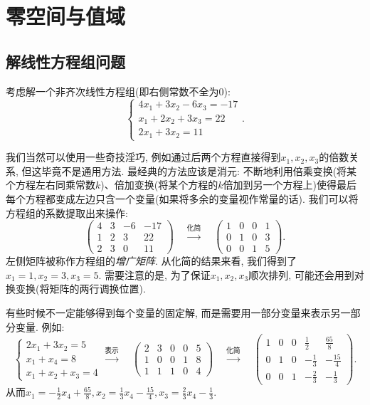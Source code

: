 \section{零空间与值域}

\subsection{解线性方程组问题}


考虑解一个非齐次线性方程组(即右侧常数不全为$0$): $$\begin{cases}
	4x_1+3x_2-6x_3=-17 \\ x_1+2x_2+3x_3=22 \\ 2x_1+3x_2 = 11
\end{cases}.$$

我们当然可以使用一些奇技淫巧, 例如通过后两个方程直接得到$x_1,x_2,x_3$的倍数关系, 但这毕竟不是通用方法. 最经典的方法应该是消元: 不断地利用倍乘变换(将某个方程左右同乘常数$k$)、倍加变换(将某个方程的$k$倍加到另一个方程上)使得最后每个方程都变成左边只含一个变量(如果将多余的变量视作常量的话). 我们可以将方程组的系数提取出来操作: $$\left(
\begin{array}{ccc|c}
  4 & 3 & -6 & -17 \\
  1 & 2 & 3 & 22 \\
  2 & 3 & 0 & 11
\end{array}
\right) \quad \stackrel{\textit{化简}}{\longrightarrow} \quad \left(
\begin{array}{ccc|c}
  1 & 0 & 0 & 1 \\
  0 & 1 & 0 & 3 \\
  0 & 0 & 1 & 5
\end{array}
\right).$$
左侧矩阵被称作方程组的\textit{增广矩阵}. 从化简的结果来看, 我们得到了$x_1=1,x_2=3,x_3=5$. 需要注意的是, 为了保证$x_1,x_2,x_3$顺次排列, 可能还会用到对换变换(将矩阵的两行调换位置). 

有些时候不一定能够得到每个变量的固定解, 而是需要用一部分变量来表示另一部分变量. 例如: $$\begin{cases}
	2x_1+3x_2=5 \\ x_1+x_4=8 \\ x_1+x_2+x_3=4
\end{cases}  \stackrel{\textit{表示}}{\longrightarrow} \quad \left(
\begin{array}{cccc|c}
  2 & 3 & 0 & 0 & 5 \\
  1 & 0 & 0 & 1 & 8 \\
  1 & 1 & 1 & 0 & 4
\end{array}
\right) \quad \stackrel{\textit{化简}}{\longrightarrow} \quad \left(
\begin{array}{cccc|c}
  1 & 0 & 0 & \frac{1}{2} & \frac{65}{8} \\
  0 & 1 & 0 & -\frac{1}{3} & -\frac{15}{4} \\
  0 & 0 & 1 & -\frac{2}{3} & -\frac{1}{3}
\end{array}
\right).$$
从而$x_1 = -\frac{1}{2}x_4+\frac{65}{8}, x_2=\frac{1}{3}x_4-\frac{15}{4},x_3=\frac{2}{3}x_4-\frac{1}{3}$. 

